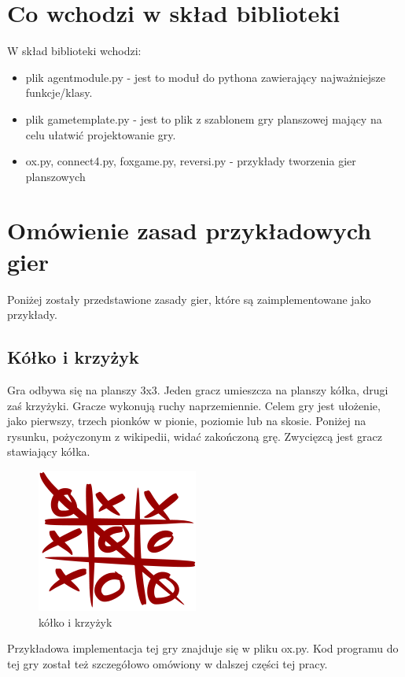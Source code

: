 \documentclass[polish,shortabstract,inz]{iithesis}
\begin{document}
\section{Co wchodzi w skład biblioteki}
W skład biblioteki wchodzi:
\begin{itemize}
  \item plik agent\textunderscore module.py - jest to moduł do pythona zawierający najważniejsze funkcje/klasy.
  \item plik game\textunderscore template.py - jest to plik z szablonem gry planszowej mający na celu ułatwić projektowanie gry.
  \item ox.py, connect4.py, fox\textunderscore game.py, reversi.py - przykłady tworzenia gier planszowych
\end{itemize}


\section{Omówienie zasad przykładowych gier}
Poniżej zostały przedstawione zasady gier, które są zaimplementowane jako przykłady.
\subsection{Kółko i krzyżyk}
Gra odbywa się na planszy 3x3.
Jeden gracz umieszcza na planszy kółka, drugi zaś krzyżyki.
Gracze wykonują ruchy naprzemiennie. Celem gry jest ułożenie, jako pierwszy, trzech pionków w pionie, poziomie lub na skosie.
Poniżej na rysunku, pożyczonym z  wikipedii, widać zakończoną grę.
Zwycięzcą jest gracz stawiający kółka.

\begin{figure}[H]
  \includegraphics{./images/tictactoe.png}
  \centering
  \caption{kółko i krzyżyk}
  \label{fig:ox}
\end{figure}

Przykładowa implementacja tej gry znajduje się w pliku ox.py.
Kod programu do tej gry został też szczegółowo omówiony w dalszej części tej pracy.
\end{document}
